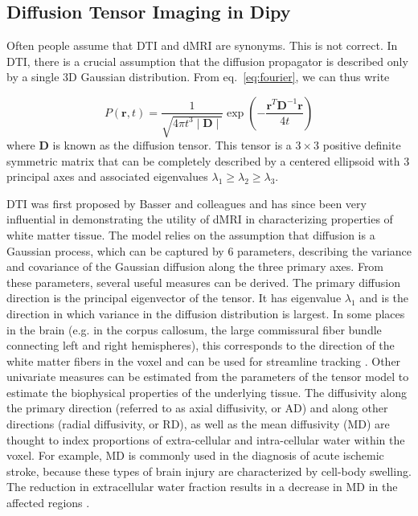 \documentclass{bioinfo}
\begin{document}
\subsection{Diffusion Tensor Imaging in Dipy}\label{dti}

Often people assume that DTI and dMRI are synonyms. This is not correct. In
DTI, there is a crucial assumption that the diffusion propagator is
described only by a single 3D Gaussian distribution. From
eq.~\ref{eq:fourier}, we can thus write

\begin{equation}
P(\mathbf{r},t)=\frac{1}{\sqrt{4\pi t^{3}\mid\mathbf{D}\mid}}\exp(-\frac{\mathbf{r}^{T}\mathbf{D}^{-1}\mathbf{r}}{4t})
\end{equation}
\noindent where $\mathbf{D}$ is known as the diffusion tensor. This tensor is a
$3\times3$ positive definite symmetric matrix that can be completely described by a
centered ellipsoid with 3 principal axes and associated eigenvalues
$\lambda_{1}\ge\lambda_{2}\ge\lambda_{3}$.

DTI was first proposed by Basser and colleagues
\citep{basser-mattiello-etal:94} and has since been very influential in
demonstrating the utility of dMRI in characterizing properties  of
white matter tissue. The model relies on the assumption that diffusion is a
Gaussian process, which can be captured by 6 parameters, describing
the variance and covariance of
the Gaussian diffusion along the three primary axes. From these
parameters, several useful measures
can be derived. The primary diffusion direction is the principal eigenvector of
the tensor. It has eigenvalue $\lambda_{1}$ and is the direction in which variance in the
diffusion distribution is largest. In some places in the brain (e.g. in the
corpus callosum, the large commissural fiber bundle connecting left
and right hemispheres), this corresponds to the
direction of the white
matter fibers in the voxel and can be used for streamline tracking
\citep{conturo-lori-etal:99, Mori1999, Basser2000}. Other univariate measures
can be estimated from the parameters of the tensor model to estimate the biophysical
properties of the underlying tissue. The diffusivity along the primary
direction (referred to as axial diffusivity, or AD) and along other directions
(radial diffusivity, or RD), as well as the mean diffusivity (MD) are thought
to index proportions of extra-cellular and intra-cellular water within the
voxel. For example, MD is commonly used in the diagnosis of acute ischemic
stroke, because these types of brain injury are characterized by cell-body
swelling. The reduction in extracellular water fraction results in a decrease
in MD in the affected regions \citep{Maas2005}.
\end{document}
